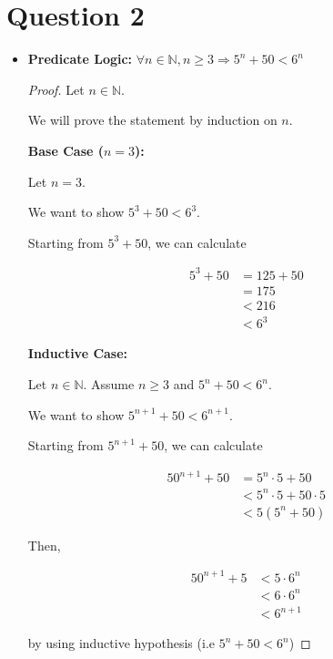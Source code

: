 \documentclass[12pt]{article}
\begin{document}
\section*{Question 2}
\begin{itemize}
    \item

    \textbf{Predicate Logic:} $\forall n \in \mathbb{N}, n \geq 3 \Rightarrow 5^n + 50 < 6^n$

    \bigskip

    \begin{proof}

    Let $n \in \mathbb{N}$.

    \bigskip

    We will prove the statement by induction on $n$.

    \bigskip

    \textbf{Base Case ($n = 3$):}

    \bigskip

    Let $n = 3$.

    \bigskip

    We want to show $5^3 + 50 < 6^3$.

    \bigskip

    Starting from $5^3 + 50$, we can calculate

    \setcounter{equation}{0}
    \begin{align}
        5^3 + 50 &= 125 + 50\\
        &= 175\\
        &< 216\\
        &< 6^3
    \end{align}

    \bigskip

    \textbf{Inductive Case:}

    \bigskip

    Let $n \in \mathbb{N}$. Assume $n \geq 3$ and $5^n + 50 < 6^n$.

    \bigskip

    We want to show $5^{n+1} + 50 < 6^{n+1}$.

    \bigskip

    Starting from $5^{n+1} + 50$, we can calculate

    \begin{align}
        50^{n+1} + 50 &= 5^n \cdot 5 + 50\\
        &< 5^n \cdot 5 + 50 \cdot 5\\
        &< 5(5^n + 50)
    \end{align}

    \bigskip

    Then,

    \begin{align}
        50^{n+1} + 5 &< 5 \cdot 6^n\\
        &< 6 \cdot 6^n\\
        &< 6^{n+1}
    \end{align}

    by using inductive hypothesis (i.e $5^n + 50 < 6^n$)

    \end{proof}
\end{itemize}
\end{document}
